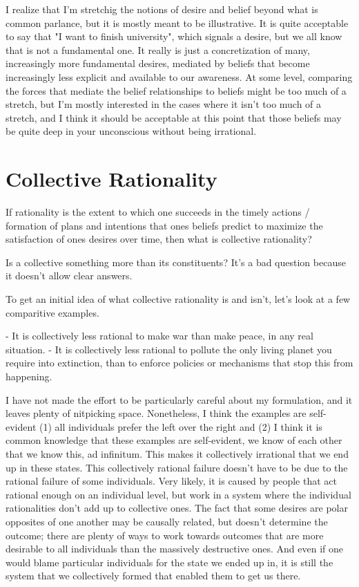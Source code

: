 I realize that I'm stretchig the notions of desire and belief beyond what is common parlance, but it is mostly meant to be illustrative. It is quite acceptable to say that "I want to finish university", which signals a desire, but we all know that is not a fundamental one. It really is just a concretization of many, increasingly more fundamental desires, mediated by beliefs that become increasingly less explicit and available to our awareness. At some level, comparing the forces that mediate the belief relationships to beliefs might be too much of a stretch, but I'm mostly interested in the cases where it isn't too much of a stretch, and I think it should be acceptable at this point that those beliefs may be quite deep in your unconscious without being irrational.

\section{Collective Rationality}

If rationality is the extent to which one succeeds in the timely actions / formation of plans and intentions that ones beliefs predict to maximize the satisfaction of ones desires over time, then what is collective rationality?

Is a collective something more than its constituents? It's a bad question because it doesn't allow clear answers.

To get an initial idea of what collective rationality is and isn't, let's look at a few comparitive examples.

- It is collectively less rational to make war than make peace, in any real situation.
- It is collectively less rational to pollute the only living planet you require into extinction, than to enforce policies or mechanisms that stop this from happening.

I have not made the effort to be particularly careful about my formulation, and it leaves plenty of nitpicking space. Nonetheless, I think the examples are self-evident (1) all individuals prefer the left over the right and (2) I think it is common knowledge that these examples are self-evident, we know of each other that we know this, ad infinitum. This makes it collectively irrational that we end up in these states. This collectively rational failure doesn't have to be due to the rational failure of some individuals. Very likely, it is caused by people that act rational enough on an individual level, but work in a system where the individual rationalities don't add up to collective ones. The fact that some desires are polar opposites of one another may be causally related, but doesn't determine the outcome; there are plenty of ways to work towards outcomes that are more desirable to all individuals than the massively destructive ones. And even if one would blame particular individuals for the state we ended up in, it is still the system that we collectively formed that enabled them to get us there.

